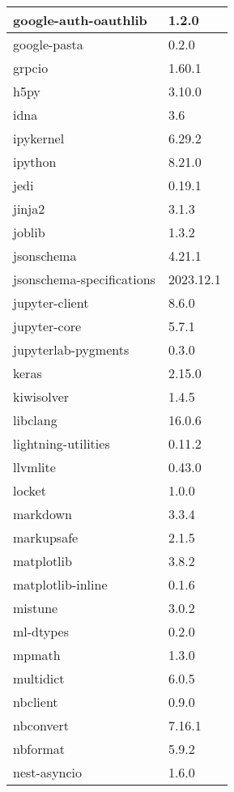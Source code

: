 \begin{longtable}{|l|l|}
	google-auth-oauthlib & 1.2.0 \\ \hline
	google-pasta         & 0.2.0 \\ \hline
	grpcio               & 1.60.1 \\ \hline
	h5py                 & 3.10.0 \\ \hline
	idna                 & 3.6 \\ \hline
	ipykernel            & 6.29.2 \\ \hline
	ipython              & 8.21.0 \\ \hline
	jedi                 & 0.19.1 \\ \hline
	jinja2               & 3.1.3 \\ \hline
	joblib               & 1.3.2 \\ \hline
	jsonschema           & 4.21.1 \\ \hline
	jsonschema-specifications & 2023.12.1 \\ \hline
	jupyter-client       & 8.6.0 \\ \hline
	jupyter-core         & 5.7.1 \\ \hline
	jupyterlab-pygments  & 0.3.0 \\ \hline
	keras                & 2.15.0 \\ \hline
	kiwisolver           & 1.4.5 \\ \hline
	libclang             & 16.0.6 \\ \hline
	lightning-utilities  & 0.11.2 \\ \hline
	llvmlite             & 0.43.0 \\ \hline
	locket               & 1.0.0 \\ \hline
	markdown             & 3.3.4 \\ \hline
	markupsafe           & 2.1.5 \\ \hline
	matplotlib           & 3.8.2 \\ \hline
	matplotlib-inline    & 0.1.6 \\ \hline
	mistune              & 3.0.2 \\ \hline
	ml-dtypes            & 0.2.0 \\ \hline
	mpmath               & 1.3.0 \\ \hline
	multidict            & 6.0.5 \\ \hline
	nbclient             & 0.9.0 \\ \hline
	nbconvert            & 7.16.1 \\ \hline
	nbformat             & 5.9.2 \\ \hline
	nest-asyncio         & 1.6.0 \\ \hline

\end{longtable}
